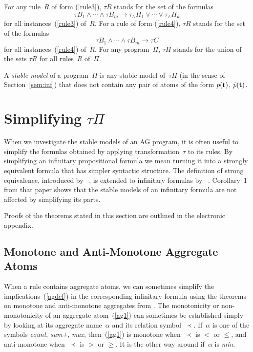 \documentclass{tlp}
\def\rar{\rightarrow}
\begin{document}
For any rule~$R$ of form (\ref{rule3}), $\tau R$ stands for the set of the
formulas
$$
\tau B_1\land\cdots\land\tau B_m\rar\tau_{\land} H_1\lor\cdots\lor\tau_{\land} H_k
$$
for all instances~(\ref{rule3}) of~$R$.
For a rule of form (\ref{rule4}), $\tau R$ stands for the set of the
formulas
$$
\tau B_1\land\cdots\land\tau B_m\rar\tau C
$$
for all instances~(\ref{rule4}) of~$R$.
For any program~$\Pi$, $\tau \Pi$ stands for the union of the sets
$\tau R$ for all rules~$R$ of~$\Pi$.

A {\sl stable model} of a program~$\Pi$
is any stable model of~$\tau\Pi$ (in the sense of Section~\ref{sem:inf})
that does
not contain any pair of atoms of the form $p({\bf t})$, $\tilde{p}({\bf t})$.

\section{Simplifying $\tau\Pi$}

When we investigate the stable models of an AG program, it is often
useful to simplify the formulas obtained by applying transformation~$\tau$ to
its rules.  By simplifying an infinitary propositional formula we mean turning
it into a strongly equivalent formula that has
simpler syntactic structure.  The definition of strong equivalence,
introduced by~ \citeyear{lif01}, is extended to infinitary
formulas by~ \citeyear{har15a}.  Corollary~1 from that paper
shows that the stable models of an infinitary formula are not
affected by simplifying its parts.

Proofs of the theorems stated in this section are outlined
in the electronic appendix.

\subsection{Monotone and Anti-Monotone Aggregate Atoms}\label{sec:mon}

When a rule contains aggregate atoms, we can sometimes simplify the
implications~(\ref{agdef}) in the corresponding infinitary formula using
the theorems on monotone and anti-monotone aggregates from
 \citeyear[Section~6.1]{har14a}.
The monotonicity or non-monotonicity of an
aggregate atom~(\ref{ag1}) can sometimes be established simply by looking
at its aggregate name~$\alpha$ and its relation symbol~$\prec$.  If~$\alpha$
is one of the symbols {\it count}, {\it sum+}, {\it max}, then~(\ref{ag1}) is
monotone when~$\prec$ is $<$ or $\leq$, and anti-monotone when~$\prec$ is
$>$ or $\geq$.  It is the other way around if~$\alpha$ is {\it min}.
\end{document}

